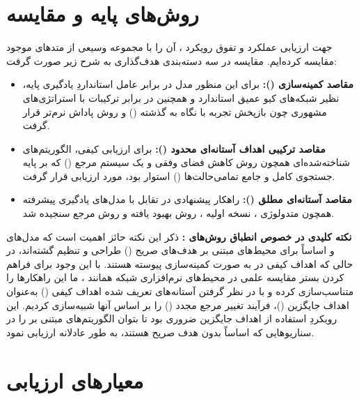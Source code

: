 \documentclass[oneside,openany,phd]{TMU-Thesis}
\begin{document}
\section{روش‌های پایه و مقایسه}

جهت ارزیابی عملکرد و تفوق رویکرد ، آن را با مجموعه وسیعی از متدهای موجود مقایسه کرده‌ایم. مقایسه در سه دسته‌بندی هدف‌گذاری به شرح زیر صورت گرفت:

\begin{itemize}
  \item \textbf{مقاصد کمینه‌سازی ():} برای این منظور مدل در برابر عامل استانداردِ یادگیری پایه، نظیر شبکه‌های کیو عمیق استاندارد  \cite{mnih2015human} و همچنین در برابر ترکیبات  با استراتژی‌های مشهوری چون بازپخش تجربه با نگاه به گذشته  () \cite{andrychowicz2017her} و روش پاداش نرم‌تر  \cite{he2020softher} قرار گرفت. 
  \item \textbf{مقاصد ترکیبی اهداف آستانه‌ای محدود ():} برای ارزیابی کیفی، الگوریتم‌های شناخته‌شده‌ای همچون روش کاهش فضای وفقی  \cite{metzger2022realizing} و یک سیستم مرجع () که بر پایه جستجوی کامل و جامع تمامی‌حالت‌ها () استوار بود، مورد ارزیابی قرار گرفت.
  \item \textbf{مقاصد آستانه‌ای مطلق ():} راهکار پیشنهادی در تقابل با مدل‌های یادگیری پیشرفته همچون متدولوژی  \cite{kachi2023hybrid}، نسخه اولیه  \cite{metzger2022realizing}، روش بهبود یافته  \cite{metzger2022realizing} و روش مرجع سنجیده شد.
\end{itemize}

\textbf{نکته کلیدی در خصوص انطباق روش‌های :} ذکر این نکته حائز اهمیت است که مدل‌های  و  اساساً برای محیط‌های مبتنی بر هدف‌های صریح () طراحی و تنظیم گشته‌اند، در حالی که اهداف کیفی در  به صورت کمینه‌سازی پیوسته هستند. با این وجود برای فراهم کردن بستر مقایسه علمی در محیط‌های نرم‌افزاری شبکه همانند ، ما این راهکارها را متناسب‌سازی کرده و با در نظر گرفتن آستانه‌های تعریف شده اهداف کیفی () به‌عنوان اهداف جایگزین ()، فرآیند تغییر مرجع مجدد () را بر اساس آنها شبیه‌سازی کردیم. این رویکردِ استفاده از اهداف جایگزین ضروری بود تا بتوان الگوریتم‌های مبتنی بر  را در سناریوهایی که اساساً بدون هدف صریح هستند، به طور عادلانه ارزیابی نمود.

\section{معیارهای ارزیابی}
\end{document}
